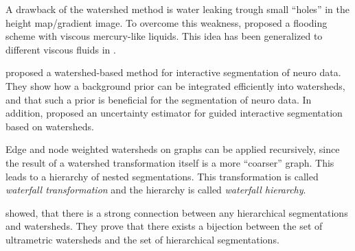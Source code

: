 A drawback of the watershed method is water leaking trough small ``holes'' in the height map/gradient image.
To overcome this weakness, 
\citet{meyer_2002_moprh}  proposed a flooding scheme with viscous mercury-like
liquids.
This idea has been generalized to different viscous fluids in \citep{vachier_2005_jmiv}. 



\citet{straehle_2011_miccai} proposed a watershed-based method for interactive segmentation
of neuro data.
They show how a background prior can be  integrated efficiently into watersheds,
and that such a prior is beneficial for the segmentation of neuro data.
In addition, \citet{straehle_2012_cvpr} proposed an uncertainty estimator for
guided interactive segmentation based on watersheds.

\label{sec:rw_waterfall}

Edge and node weighted watersheds on graphs can be applied recursively, since
the result of a watershed transformation itself is a more ``coarser'' graph.
This leads to a hierarchy of nested segmentations.
This transformation is called \emph{waterfall transformation} \cite{beuchner_1994_waterfall} and
the hierarchy is called \emph{waterfall hierarchy}.

 showed, that there is a
strong connection between any hierarchical segmentations
and watersheds.
They prove that there exists a bijection between
the set of ultrametric watersheds \citep{najman_2010_corr} and the set of hierarchical segmentations.

